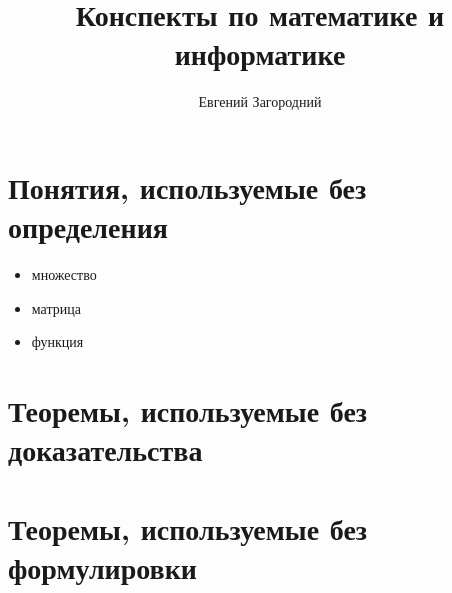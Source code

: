 \documentclass[a4paper]{book}
\title{Конспекты по математике и информатике}
\author{Евгений Загородний}
\begin{document}
\frontmatter
\maketitle

\tableofcontents


\mainmatter









\appendix
\chapter{Понятия, используемые без определения}

\begin{itemize}
  \item множество 
  \item матрица 
  \item функция 
\end{itemize}

\chapter{Теоремы, используемые без доказательства}
\chapter{Теоремы, используемые без формулировки}

\backmatter
\printindex
\printbibliography
\end{document}
